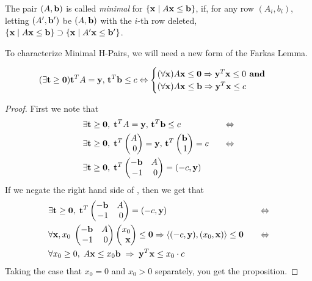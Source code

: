\begin{Def}
	The pair $(A,\mathbf{b})$ is called \textit{minimal} for $\left\{\mathbf{x}\;|\; A\mathbf{x}\leq \mathbf{b}\right\}$, if, for any row $(A_i,b_i)$, letting $(A',\mathbf{b}')$ be $(A,\mathbf{b})$ with the $i$-th row deleted, $\left\{\mathbf{x}\;|\; A\mathbf{x}\leq \mathbf{b}\right\} \supset \left\{\mathbf{x}\;|\; A'\mathbf{x}\leq \mathbf{b}'\right\}$.
\end{Def}

To characterize Minimal H-Pairs, we will need a new form of the Farkas Lemma.

\begin{Thm}\label{farkas_lemma2}
	\[ (\exists \mathbf{t}\geq\mathbf{0}) \mathbf{t}^T A = \mathbf{y},\, \mathbf{t}^T\mathbf{b} \leq c \Leftrightarrow
		\begin{cases}
			(\forall \mathbf{x}) A\mathbf{x}\leq \mathbf{0} \Rightarrow \mathbf{y}^T\mathbf{x} \leq 0 \textbf{ and } \\
			(\forall \mathbf{x}) A\mathbf{x}\leq \mathbf{b} \Rightarrow \mathbf{y}^T\mathbf{x} \leq c
		\end{cases}
	\]
\end{Thm}

\begin{proof}
	First we note that
	\begin{alignat*}{2}
		 & \exists \t\geq\0,\; \t^TA =\y,\,\t^T\b\leq c & \Leftrightarrow \\
		 & \exists \t\geq\0,\; \t^T\pmb A                                 \\ 0\pme  =\y,\,\t^T \pmb \b \\ 1\pme = c \quad& \Leftrightarrow \\
		 & \exists \t\geq\0,\; \t^T\pmb -\b             & A               \\ -1 & 0 \pme = (-c,\y)
	\end{alignat*}
	If we negate the right hand side of , then we get that
	\begin{alignat*}{2}
		 & \exists \t\geq\0,\; \t^T\pmb -\b                                            & A \\ -1 & 0 \pme = (-c,\y) & \Leftrightarrow \\
		 & \forall \x,x_0\;  \pmb -\b                                                  & A \\ -1 & 0 \pme\pmb x_0 \\ \x\pme \leq \0 \Rightarrow \ip{(-c,\y)}{(x_0,\x)} \leq \0 \quad & \Leftrightarrow                                       \\
		 & \forall x_0\geq 0,\;  A\x\leq x_0\b \;\Rightarrow \;\y^T\x \leq x_0 \cdot c
	\end{alignat*}
	Taking the case that $x_0 = 0$ and $x_0 > 0$ separately, you get the proposition.
\end{proof}

